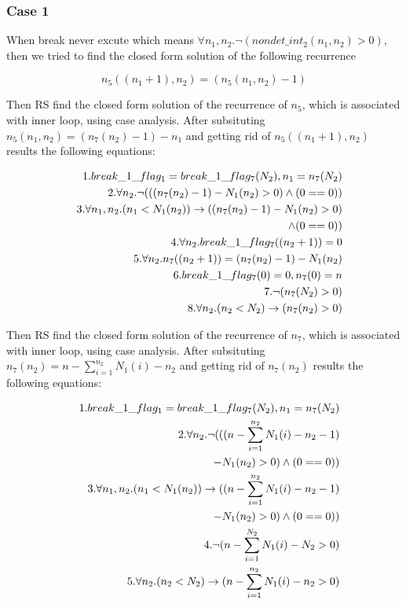 \subsubsection{Case 1} When break never excute which means $\forall n_1,n_2. \neg (nondet\_int_2(n_1,n_2)>0)$, then we tried to find the closed form solution of the following recurrence

\[n_5((n_1+1),n_2) = (n_5(n_1,n_2)-1)\]

Then RS find the closed form solution of the recurrence of $n_5$, which is associated  with inner loop, using case analysis. After subsituting $n_5(n_1,n_2)=(n_7(n_2)-1)-n_1$ and getting rid of $n_5((n_1+1),n_2)$ results the following equations:

\begin{eqnarray*}
	&&1.break\_1\_flag_1 = break\_1\_flag_7(N_2), n_1 = n_7(N_2)\\
	&&2.\forall n_2.\neg (((n_7(n_2)-1)-N_1(n_2)>0) \land (0==0))\\
	&&3.\forall n_1,n_2.(n_1<N_1(n_2)) \rightarrow ((n_7(n_2)-1)-N_1(n_2)>0)\\
	&&\hspace*{5em}\land (0==0))\\
	&&4.\forall n_2.break\_1\_flag_7((n_2+1)) = 0\\
	&&5.\forall n_2.n_7((n_2+1)) = (n_7(n_2)-1)-N_1(n_2)\\
	&&6.break\_1\_flag_7(0) = 0, n_7(0) = n\\
	&&7.\neg (n_7(N_2)>0)\\
	&&8.\forall n_2.(n_2<N_2) \rightarrow (n_7(n_2)>0)
\end{eqnarray*}

Then RS find the closed form solution of the recurrence of $n_7$, which is associated  with inner loop, using case analysis. After subsituting $n_7(n_2)=n -\sum_{i=1}^{n_2}N_1(i)-n_2$ and getting rid of $n_7(n_2)$ results the following equations:

\begin{eqnarray*}
	&&1.break\_1\_flag_1 = break\_1\_flag_7(N_2), n_1 = n_7(N_2)\\
	&&2.\forall n_2.\neg (((n -\sum_{i=1}^{n_2}N_1(i)-n_2-1)\\
	&&\hspace*{5em}-N_1(n_2)>0) \land (0==0))\\
	&&3.\forall n_1,n_2.(n_1<N_1(n_2)) \rightarrow ((n -\sum_{i=1}^{n_2}N_1(i)-n_2-1)\\
	&&\hspace*{5em}-N_1(n_2)>0) \land (0==0))\\
	&&4.\neg (n -\sum_{i=1}^{N_2}N_1(i)-N_2>0)\\
	&&5.\forall n_2.(n_2<N_2) \rightarrow (n -\sum_{i=1}^{n_2}N_1(i)-n_2>0)
\end{eqnarray*}

